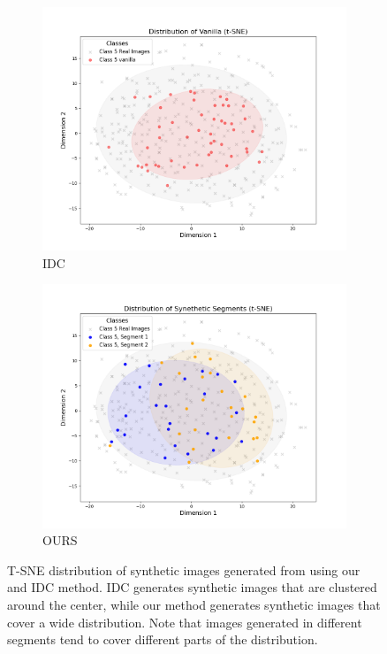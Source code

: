 \documentclass{article}
\theoremstyle{plain}
\theoremstyle{definition}
\theoremstyle{remark}
\begin{document}
\begin{figure}[t]
    \centering
    \begin{subfigure}[b]{0.23\textwidth}  %
        \centering
        \includegraphics[width=\textwidth]{./images/vanilla.png}  %
        \caption{IDC}
        \label{fig:IDC}
    \end{subfigure}
    \hfill
    \begin{subfigure}[b]{0.23\textwidth}  %
        \centering
        \includegraphics[width=\textwidth]{./images/ours.png}  %
        \caption{OURS}
        \label{fig:EDD}
    \end{subfigure}
    
    \caption{T-SNE distribution of synthetic images generated from using our and IDC method. IDC generates synthetic images that are clustered around the center, while our method generates synthetic images that cover a wide distribution. Note that images generated in different segments tend to cover different parts of the distribution.}
    \label{fig:mainfigure}
\end{figure}
\end{document}
